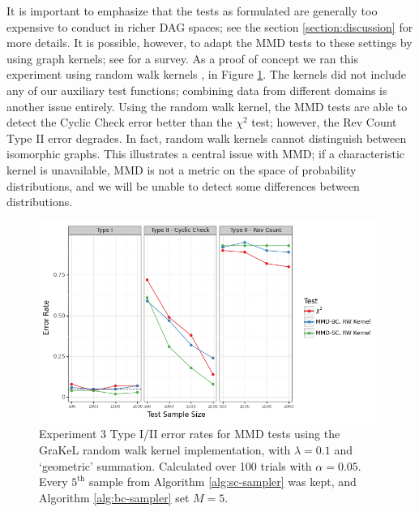 \documentclass[a4paper,11pt]{article}
\begin{document}
It is important to emphasize that the tests as formulated are generally too expensive to conduct in richer DAG spaces; see the section \ref{section:discussion} for more details. It is possible, however, to adapt the MMD tests to these settings by using graph kernels; see \cite{kriege_survey_2020} for a survey. As a proof of concept we ran this experiment using random walk kernels \cite{gartner_graph_2003}, \cite{vishwanathan_fast_2006} in Figure \ref{fig:ex3_rw}. The kernels did not include any of our auxiliary test functions; combining data from different domains is another issue entirely. Using the random walk kernel, the MMD tests are able to detect the Cyclic Check error better than the $\chi^{2}$ test; however, the Rev Count Type II error degrades. In fact, random walk kernels cannot distinguish between isomorphic graphs. This illustrates a central issue with MMD; if a characteristic kernel is unavailable, MMD is not a metric on the space of probability distributions, and we will be unable to detect some differences between distributions.

\begin{figure}[H]
    \centering
    \includegraphics[width=\textwidth]{figures/graph_random_walk.png}
    \caption{Experiment 3 Type I/II error rates for MMD tests using the GraKeL \cite{siglidis_grakel_2020} random walk kernel implementation, with $\lambda=0.1$ and `geometric' summation. Calculated over 100 trials with $\alpha=0.05$. Every $5^{\text{th}}$ sample from Algorithm \ref{alg:sc-sampler} was kept, and Algorithm \ref{alg:bc-sampler} set $M=5$.}
    \label{fig:ex3_rw}
\end{figure}
\end{document}
